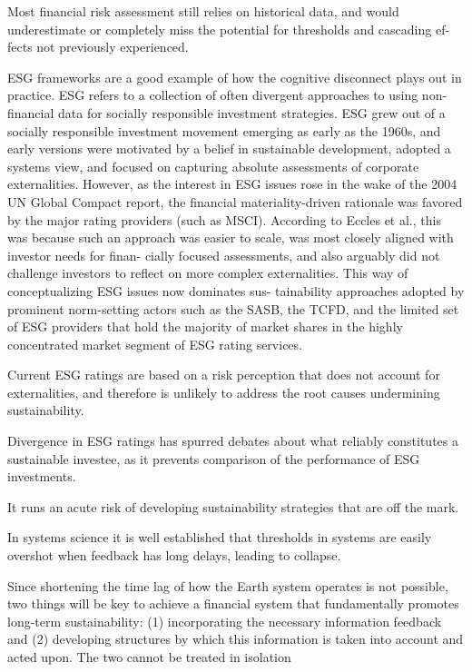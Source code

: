 \documentclass[
]{book}
\begin{document}
Most financial risk assessment
still relies on historical data, and would underestimate or
completely miss the potential for thresholds and cascading ef-
fects not previously experienced.

ESG frameworks are a good example of how the cognitive
disconnect plays out in practice. ESG refers to a collection of often
divergent approaches to using non-financial data for socially
responsible investment strategies. ESG grew out of a socially
responsible investment movement emerging as early as the
1960s, and early versions were motivated by a belief in sustainable
development, adopted a systems view, and focused on capturing
absolute assessments of corporate externalities. However, as
the interest in ESG issues rose in the wake of the 2004 UN Global
Compact report, the financial materiality-driven rationale was
favored by the major rating providers (such as MSCI). According
to Eccles et al., this was because such an approach was easier
to scale, was most closely aligned with investor needs for finan-
cially focused assessments, and also arguably did not challenge
investors to reflect on more complex externalities.
This way of conceptualizing ESG issues now dominates sus-
tainability approaches adopted by prominent norm-setting
actors such as the SASB, the TCFD, and the limited set of ESG
providers that hold the majority of market shares in the highly
concentrated market segment of ESG rating services.

Current ESG ratings are based on a risk
perception that does not account for externalities, and therefore
is unlikely to address the root causes undermining sustainability.

Divergence in ESG
ratings has spurred debates about what reliably constitutes a
sustainable investee, as it prevents comparison of the performance of ESG investments.

It runs an acute risk of developing sustainability strategies that are off the mark.

In systems science it is well
established that thresholds in systems are easily overshot
when feedback has long delays, leading to collapse.

Since shortening the time lag of how the Earth system operates
is not possible, two things will be key to achieve a financial
system that fundamentally promotes long-term sustainability:
(1) incorporating the necessary information feedback and
(2) developing structures by which this information is taken
into account and acted upon. The two cannot be treated in
isolation
\end{document}
